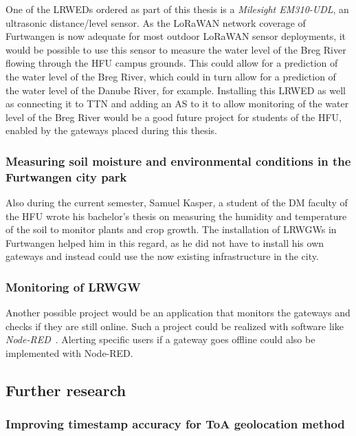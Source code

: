 One of the \aclp{LRWED} ordered as part of this thesis is a \emph{Milesight EM310-UDL}, an ultrasonic distance/level sensor.
As the \ac{LoRaWAN} network coverage of Furtwangen is now adequate for most outdoor \ac{LoRaWAN} sensor deployments, it would be possible to use this sensor to measure the water level of the Breg River flowing through the \ac{HFU} campus grounds.
This could allow for a prediction of the water level of the Breg River, which could in turn allow for a prediction of the water level of the Danube River, for example.
Installing this \acl{LRWED} as well as connecting it to \ac{TTN} and adding an \acf{AS} to it to allow monitoring of the water level of the Breg River would be a good future project for students of the \ac{HFU}, enabled by the gateways placed during this thesis.

\subsubsection{Measuring soil moisture and environmental conditions in the Furtwangen city park}

Also during the current semester, Samuel Kasper, a student of the \ac{DM} faculty of the \ac{HFU} wrote his bachelor's thesis on measuring the humidity and temperature of the soil to monitor plants and crop growth.
The installation of \aclp{LRWGW} in Furtwangen helped him in this regard, as he did not have to install his own gateways and instead could use the now existing infrastructure in the city.

\subsubsection{Monitoring of \acl{LRWGW}}

Another possible project would be an application that monitors the gateways and checks if they are still online.
Such a project could be realized with software like \emph{Node-RED}~\cite{openjs_foundation_node-red_nodate}.
Alerting specific users if a gateway goes offline could also be implemented with Node-RED.

\subsection{Further research}

\subsubsection{Improving timestamp accuracy for \acl{ToA} geolocation method}

